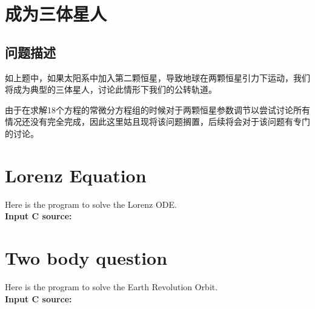 \documentclass[twoside,twocolumn]{article}
\begin{document}
\begin{CJK*}{UTF8}{gkai}

\section{成为三体星人}
\subsection{问题描述}
如上题中，如果太阳系中加入第二颗恒星，导致地球在两颗恒星引力下运动，我们将成为典型的三体星人，讨论此情形下我们的公转轨道。

由于在求解18个方程的常微分方程组的时候对于两颗恒星参数调节以尝试讨论所有情况还没有完全完成，因此这里姑且现将该问题搁置，后续将会对于该问题有专门的讨论。


\newpage
\onecolumn
\begin{appendices}
\section{Lorenz Equation}
Here is the program to solve the Lorenz ODE.\\
\textbf{\textcolor[rgb]{0.98,0.00,0.00}{Input C source:}}


\section{Two body question}
Here is the program to solve the Earth Revolution Orbit.\\
\textbf{\textcolor[rgb]{0.98,0.00,0.00}{Input C source:}}


\end{appendices}



\end{CJK*}
\end{document}
